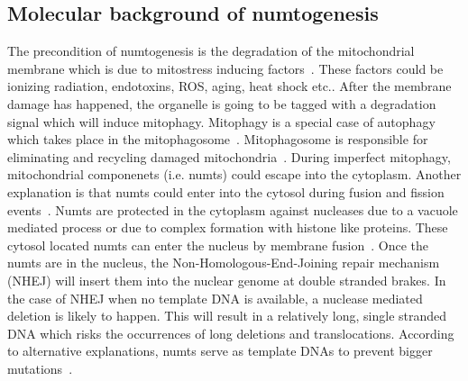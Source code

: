 \documentclass[a4paper,12pt]{article}
\numberwithin{equation}{section} %
\begin{document}
\subsection{Molecular background of numtogenesis}
\indent The precondition of numtogenesis is the degradation of the mitochondrial membrane which is due to mitostress inducing factors~. These factors could be ionizing radiation, endotoxins, ROS, aging, heat shock etc.. After the membrane damage has happened, the organelle is going to be tagged with a degradation signal which will induce mitophagy. Mitophagy is a special case of autophagy which takes place in the mitophagosome~. Mitophagosome is responsible for eliminating and recycling damaged mitochondria~. During imperfect mitophagy, mitochondrial componenets (i.e. numts) could escape into the cytoplasm. Another explanation is that numts could enter into the cytosol during fusion and fission events~. Numts are protected in the cytoplasm against nucleases due to a vacuole mediated process or due to complex formation with histone like proteins. These cytosol located numts can enter the nucleus by membrane fusion~. Once the numts are in the nucleus, the Non-Homologous-End-Joining repair mechanism (NHEJ) will insert them into the nuclear genome at double stranded brakes. In the case of NHEJ when no template DNA is available, a nuclease mediated deletion is likely to happen. This will result in a relatively long, single stranded DNA which risks the occurrences of long deletions and translocations. According to alternative explanations, numts serve as template DNAs to prevent bigger mutations~.
\end{document}
